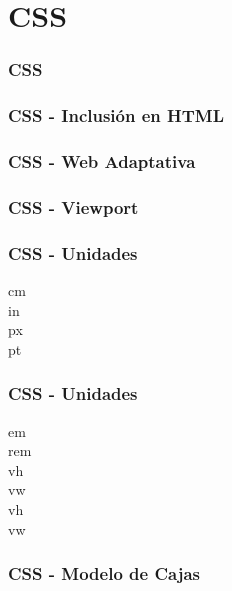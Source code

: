 \documentclass[a4paper,slidestop,xcolor=pst,blue]{beamer}
\begin{document}
\section{CSS}

\begin{frame}[c]
    \frametitle{CSS}
\end{frame}

\begin{frame}[c]
    \frametitle{CSS - Inclusión en HTML}
\end{frame}

\begin{frame}[c]
    \frametitle{CSS - Web Adaptativa}
\end{frame}

\begin{frame}[c]
    \frametitle{CSS - Viewport}
\end{frame}

\begin{frame}[c]
    \frametitle{CSS - Unidades}
    \begin{description}
        \item[cm]
        \item[in]
        \item[px]
        \item[pt]
    \end{description}
\end{frame}

\begin{frame}[c]
    \frametitle{CSS - Unidades}
    \begin{description}
        \item[em]
        \item[rem]
        \item[vh]
        \item[vw]
        \item[vh]
        \item[vw]
    \end{description}
\end{frame}

\begin{frame}[c]
    \frametitle{CSS - Modelo de Cajas}
\end{frame}
\end{document}
